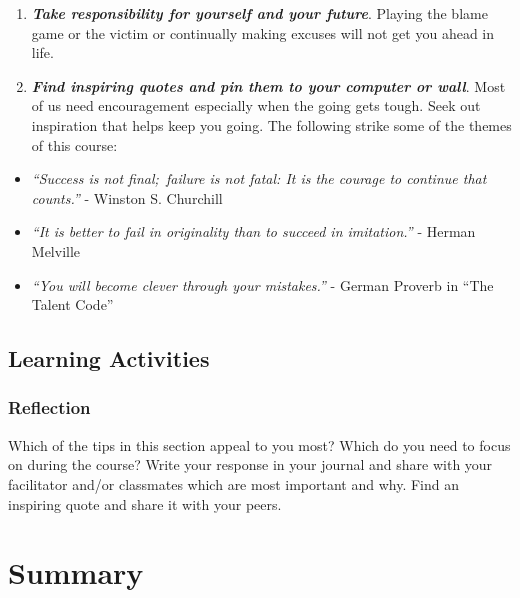 \documentclass[
]{book}
\begin{document}
\begin{enumerate}
\item
  \textbf{\emph{Take responsibility for yourself and your future}}. Playing the blame game or the victim or continually making excuses will not get you ahead in life.
\item
  \textbf{\emph{Find inspiring quotes and pin them to your computer or wall}}. Most of us need encouragement especially when the going gets tough. Seek out inspiration that helps keep you going. The following strike some of the themes of this course:
\end{enumerate}

\begin{itemize}
\item
  \emph{``Success is not final;~failure is not fatal: It is the courage to continue that counts.''} - Winston S. Churchill
\item
  \emph{``It is better to fail in originality than to succeed in imitation.''} - Herman Melville
\item
  \emph{``You will become clever through your mistakes.''} - German Proverb in ``The Talent Code''
\end{itemize}

\hypertarget{learning-activities-2}{%
\subsection*{Learning Activities}\label{learning-activities-2}}

\begin{reflect}
\hypertarget{reflection}{%
\subsubsection*{Reflection}\label{reflection}}

Which of the tips in this section appeal to you most? Which do you need to focus on during the course? Write your response in your journal and share with your facilitator and/or classmates which are most important and why. Find an inspiring quote and share it with your peers.
\end{reflect}

\hypertarget{summary}{%
\section*{Summary}\label{summary}}
\end{document}
